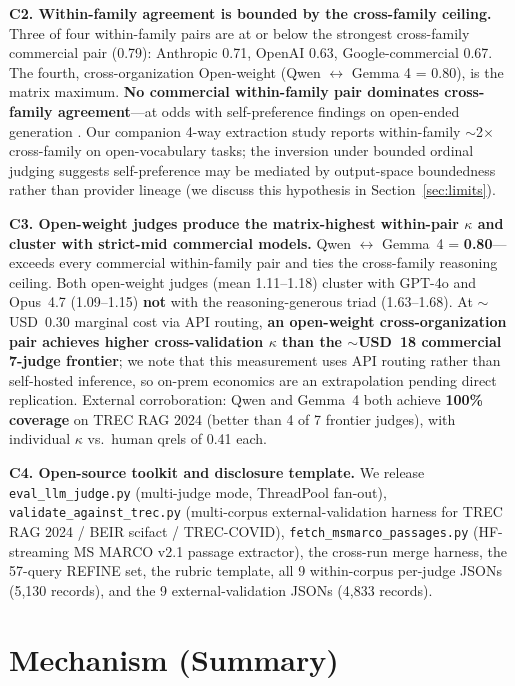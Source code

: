 \documentclass[11pt,letterpaper]{article}
\begin{document}
\textbf{C2. Within-family agreement is bounded by the cross-family ceiling.} Three of four within-family pairs are at or below the strongest cross-family commercial pair (0.79): Anthropic 0.71, OpenAI 0.63, Google-commercial 0.67. The fourth, cross-organization Open-weight (Qwen $\leftrightarrow$ Gemma 4 = 0.80), is the matrix maximum. \textbf{No commercial within-family pair dominates cross-family agreement}---at odds with self-preference findings on open-ended generation \citep{panickssery2024self}. Our companion 4-way extraction study reports within-family $\sim$2$\times$ cross-family on open-vocabulary tasks; the inversion under bounded ordinal judging suggests self-preference may be mediated by output-space boundedness rather than provider lineage (we discuss this hypothesis in Section~\ref{sec:limits}).

\textbf{C3. Open-weight judges produce the matrix-highest within-pair $\kappa$ and cluster with strict-mid commercial models.} Qwen $\leftrightarrow$ Gemma~4 = \textbf{0.80}---exceeds every commercial within-family pair and ties the cross-family reasoning ceiling. Both open-weight judges (mean 1.11--1.18) cluster with GPT-4o and Opus~4.7 (1.09--1.15) \textbf{not} with the reasoning-generous triad (1.63--1.68). At $\sim$USD~0.30 marginal cost via API routing, \textbf{an open-weight cross-organization pair achieves higher cross-validation $\kappa$ than the $\sim$USD~18 commercial 7-judge frontier}; we note that this measurement uses API routing rather than self-hosted inference, so on-prem economics are an extrapolation pending direct replication. External corroboration: Qwen and Gemma~4 both achieve \textbf{100\% coverage} on TREC RAG 2024 (better than 4 of 7 frontier judges), with individual $\kappa$ vs.\ human qrels of 0.41 each.

\textbf{C4. Open-source toolkit and disclosure template.} We release \texttt{eval\_llm\_judge.py} (multi-judge mode, ThreadPool fan-out), \texttt{validate\_against\_trec.py} (multi-corpus external-validation harness for TREC RAG 2024 / BEIR scifact / TREC-COVID), \texttt{fetch\_msmarco\_passages.py} (HF-streaming MS MARCO v2.1 passage extractor), the cross-run merge harness, the 57-query REFINE set, the rubric template, all 9 within-corpus per-judge JSONs (5{,}130 records), and the 9 external-validation JSONs (4{,}833 records).

\section{Mechanism (Summary)}\label{sec:mechanism}
\end{document}
